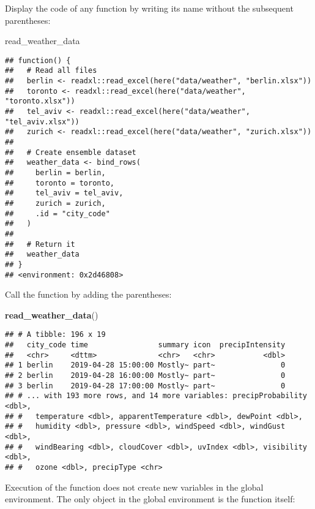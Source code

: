 \documentclass[]{book}
\newenvironment{Shaded}{\begin{snugshade}}{\end{snugshade}}
\newcommand{\KeywordTok}[1]{\textcolor[rgb]{0.13,0.29,0.53}{\textbf{#1}}}
\newcommand{\NormalTok}[1]{#1}
\begin{document}
Display the code of any function by writing its name without the subsequent parentheses:

\begin{Shaded}
\begin{Highlighting}[]
\NormalTok{read_weather_data}
\end{Highlighting}
\end{Shaded}

\begin{verbatim}
## function() {
##   # Read all files
##   berlin <- readxl::read_excel(here("data/weather", "berlin.xlsx"))
##   toronto <- readxl::read_excel(here("data/weather", "toronto.xlsx"))
##   tel_aviv <- readxl::read_excel(here("data/weather", "tel_aviv.xlsx"))
##   zurich <- readxl::read_excel(here("data/weather", "zurich.xlsx"))
## 
##   # Create ensemble dataset
##   weather_data <- bind_rows(
##     berlin = berlin,
##     toronto = toronto,
##     tel_aviv = tel_aviv,
##     zurich = zurich,
##     .id = "city_code"
##   )
## 
##   # Return it
##   weather_data
## }
## <environment: 0x2d46808>
\end{verbatim}

Call the function by adding the parentheses:

\begin{Shaded}
\begin{Highlighting}[]
\KeywordTok{read_weather_data}\NormalTok{()}
\end{Highlighting}
\end{Shaded}

\begin{verbatim}
## # A tibble: 196 x 19
##   city_code time                summary icon  precipIntensity
##   <chr>     <dttm>              <chr>   <chr>           <dbl>
## 1 berlin    2019-04-28 15:00:00 Mostly~ part~               0
## 2 berlin    2019-04-28 16:00:00 Mostly~ part~               0
## 3 berlin    2019-04-28 17:00:00 Mostly~ part~               0
## # ... with 193 more rows, and 14 more variables: precipProbability <dbl>,
## #   temperature <dbl>, apparentTemperature <dbl>, dewPoint <dbl>,
## #   humidity <dbl>, pressure <dbl>, windSpeed <dbl>, windGust <dbl>,
## #   windBearing <dbl>, cloudCover <dbl>, uvIndex <dbl>, visibility <dbl>,
## #   ozone <dbl>, precipType <chr>
\end{verbatim}

Execution of the function does not create new variables in the global environment.
The only object in the global environment is the function itself:
\end{document}
